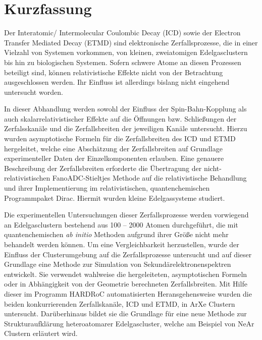 \chapter*{Kurzfassung}
\thispagestyle{empty}

Der Interatomic/ Intermolecular Coulombic Decay (ICD) sowie der
Electron Transfer Mediated Decay (ETMD) sind elektronische Zerfallsprozesse,
die in einer Vielzahl von Systemen vorkommen, von kleinen, zweiatomigen
Edelgasclustern bis hin zu biologischen Systemen. Sofern schwere Atome
an diesen Prozessen beteiligt sind, können relativistische Effekte
nicht von der Betrachtung ausgeschlossen werden. Ihr Einfluss ist allerdings
bislang nicht eingehend untersucht worden.

In dieser Abhandlung werden sowohl der Einfluss der Spin-Bahn-Kopplung
als auch skalarrelativistischer Effekte auf die Öffnungen bzw.
Schließungen der Zerfalsskanäle und die Zerfallsbreiten
der jeweiligen Kanäle untersucht.
Hierzu wurden asymptotische Formeln für die Zerfallsbreiten des ICD und ETMD
hergeleitet, welche eine Abschätzung der Zerfallsbreiten auf Grundlage
experimenteller Daten der Einzelkomponenten erlauben.
Eine genauere Beschreibung der Zerfallsbreiten erforderte die Übertragung
der nicht-relativistischen FanoADC-Stieltjes Methode auf die relativistische
Behandlung und ihrer Implementierung im relativistischen, quantenchemischen
Programmpaket Dirac. Hiermit wurden kleine Edelgassysteme studiert.

Die experimentellen Untersuchungen dieser Zerfallsprozesse werden vorwiegend an
Edelgasclustern bestehend aus 100 -- 2000 Atomen durchgeführt, die mit
quantenchemischen \emph{ab initio} Methoden aufgrund ihrer Größe
nicht mehr behandelt werden können.
Um eine Vergleichbarkeit herzustellen, wurde der Einfluss der Clusterumgebung
auf die Zerfallsprozesse untersucht und auf dieser Grundlage eine
Methode zur Simulation von Sekundärelektronenspektren entwickelt. Sie
verwendet wahlweise die hergeleiteten, asymptotischen Formeln oder
in Abhängigkeit von der Geometrie berechneten Zerfallsbreiten. Mit Hilfe dieser
im Programm HARDRoC automatisierten Heransgehensweise wurden die beiden
konkurrierenden
Zerfallskanäle, ICD und ETMD, in ArXe Clustern untersucht. Darüberhinaus
bildet sie die Grundlage für eine neue Methode zur Strukturaufklärung
heteroatomarer Edelgascluster, welche am Beispiel von NeAr Clustern
erläutert wird.
